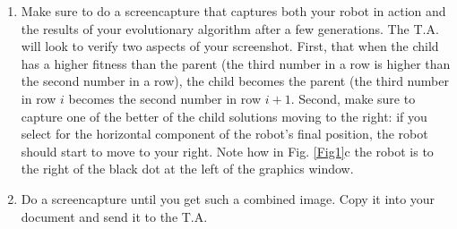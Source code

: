 \documentclass[12pt]{article}
\begin{document}
\begin{enumerate}
\item Make sure to do a screencapture that captures both your robot in action and the results of your evolutionary algorithm after a few generations. The T.A. will look to verify two aspects of your screenshot. First, that when the child has a higher fitness than the parent (the third number in a row is higher than the second number in a row), the child becomes the parent (the third number in row $i$ becomes the second number in row $i+1$. Second, make sure to capture one of the better of the child solutions moving to the right: if you select for the horizontal component of the robot's final position, the robot should start to move to your right. Note how in Fig. \ref{Fig1}c the robot is to the right of the black dot at the left of the graphics window.

\item Do a screencapture until you get such a combined image. Copy it into your document and send it to the T.A.

\end{enumerate}
\end{document}
